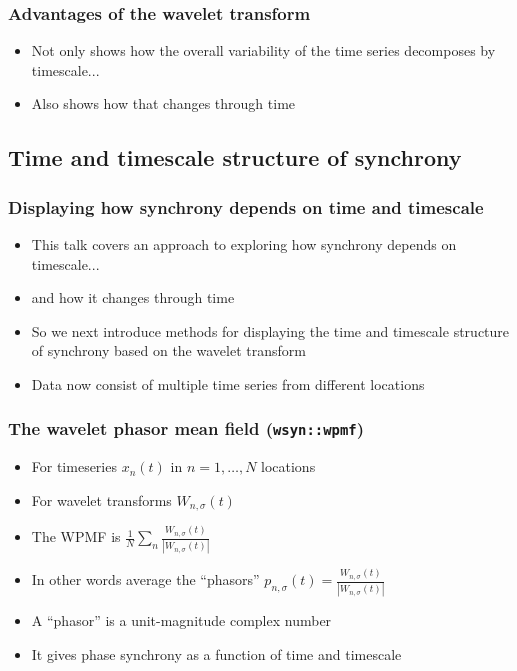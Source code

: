 \documentclass{beamer}
\begin{document}
{
\begin{frame}
\frametitle{Advantages of the wavelet transform}
\begin{itemize}
\item Not only shows how the overall variability of the time series decomposes by timescale...
\item Also shows how that changes through time
\end{itemize}
\end{frame}}

\subsection{Time and timescale structure of synchrony}

{
\begin{frame}
\frametitle{Displaying how synchrony depends on time and timescale}
\begin{itemize}
\item This talk covers an approach to exploring how synchrony depends on timescale...
\item and how it changes through time
\item So we next introduce methods for displaying the time and timescale structure of synchrony
based on the wavelet transform
\item Data now consist of multiple time series from different locations
\end{itemize}
\end{frame}}

\begin{frame}
\frametitle{The wavelet phasor mean field (\texttt{wsyn::wpmf})}
  \begin{itemize}
    \item For timeseries $x_n(t)$ in $n=1,\ldots,N$ locations
    \item For wavelet transforms $W_{n,\sigma}(t)$
    \item The WPMF is $\frac{1}{N} \sum_n \frac{W_{n,\sigma}(t)}{|W_{n,\sigma}(t)|}$
    \item In other words average the ``phasors'' $p_{n,\sigma}(t)= \frac{W_{n,\sigma}(t)}{|W_{n,\sigma}(t)|}$
    \item A ``phasor'' is a unit-magnitude complex number
    \item It gives phase synchrony as a function of time and timescale
  \end{itemize}
\end{frame}
\end{document}
